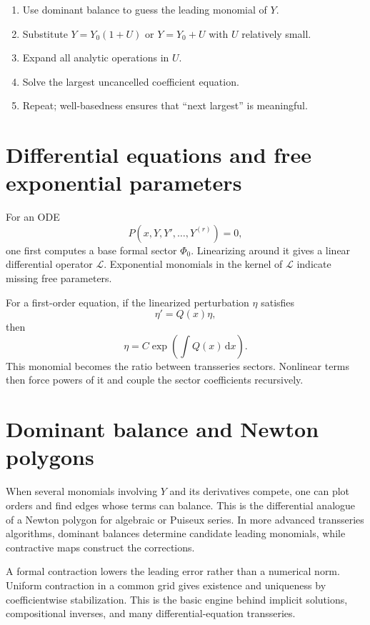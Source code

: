 \documentclass[11pt,oneside]{book}
\theoremstyle{definition}
\theoremstyle{remark}
\newcommand{\dd}{\,\mathrm{d}}
\begin{document}
\begin{recipebox}[title=Solving an implicit equation]
\begin{enumerate}
\item Use dominant balance to guess the leading monomial of $Y$.
\item Substitute $Y=Y_0(1+U)$ or $Y=Y_0+U$ with $U$ relatively small.
\item Expand all analytic operations in $U$.
\item Solve the largest uncancelled coefficient equation.
\item Repeat; well-basedness ensures that ``next largest'' is meaningful.
\end{enumerate}
\end{recipebox}

\section{Differential equations and free exponential parameters}

For an ODE
\[
  P(x,Y,Y',\ldots,Y^{(r)})=0,
\]
one first computes a base formal sector $\Phi_0$. Linearizing around it gives a
linear differential operator $\mathcal L$. Exponential monomials in the kernel
of $\mathcal L$ indicate missing free parameters.

For a first-order equation, if the linearized perturbation $\eta$ satisfies
\[
  \eta'=Q(x)\eta,
\]
then
\[
  \eta=C\exp\left(\int Q(x)\dd x\right).
\]
This monomial becomes the ratio between transseries sectors. Nonlinear terms
then force powers of it and couple the sector coefficients recursively.

\section{Dominant balance and Newton polygons}

When several monomials involving $Y$ and its derivatives compete, one can plot
orders and find edges whose terms can balance. This is the differential analogue
of a Newton polygon for algebraic or Puiseux series. In more advanced
transseries algorithms, dominant balances determine candidate leading
monomials, while contractive maps construct the corrections.

\begin{summarybox}
A formal contraction lowers the leading error rather than a numerical norm.
Uniform contraction in a common grid gives existence and uniqueness by
coefficientwise stabilization. This is the basic engine behind implicit
solutions, compositional inverses, and many differential-equation transseries.
\end{summarybox}
\end{document}
